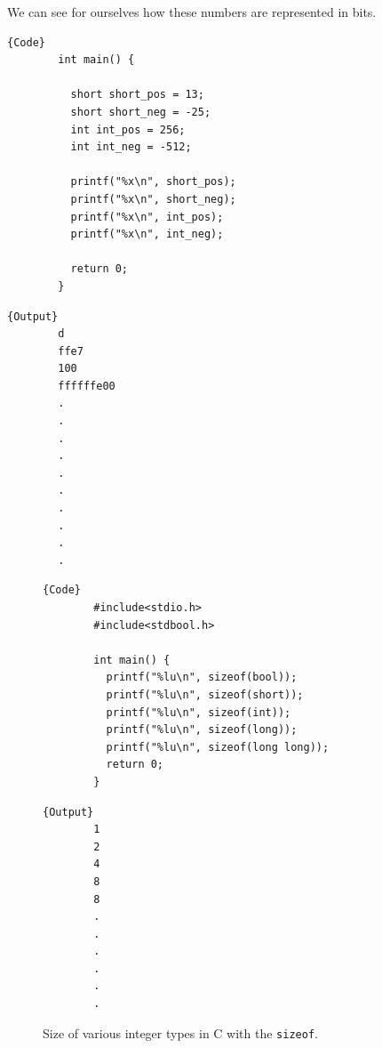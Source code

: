 \documentclass{article}
\begin{document}
    \begin{example}
      We can see for ourselves how these numbers are represented in bits. 

      \noindent\begin{minipage}{.5\textwidth}
      \begin{lstlisting}[]{Code}
        int main() { 

          short short_pos = 13; 
          short short_neg = -25; 
          int int_pos = 256;
          int int_neg = -512; 

          printf("%x\n", short_pos);
          printf("%x\n", short_neg);
          printf("%x\n", int_pos);
          printf("%x\n", int_neg);

          return 0; 
        }
      \end{lstlisting}
      \end{minipage}
      \hfill
      \begin{minipage}{.49\textwidth}
      \begin{lstlisting}[]{Output}
        d
        ffe7
        100
        ffffffe00
        .
        .
        .
        .
        .
        .
        .
        .
        .
        .
      \end{lstlisting}
      \end{minipage}
    \end{example}

    \begin{figure}[H]
      \centering 
      \noindent\begin{minipage}{.5\textwidth}
      \begin{lstlisting}[]{Code}
        #include<stdio.h>
        #include<stdbool.h>

        int main() {
          printf("%lu\n", sizeof(bool)); 
          printf("%lu\n", sizeof(short)); 
          printf("%lu\n", sizeof(int)); 
          printf("%lu\n", sizeof(long)); 
          printf("%lu\n", sizeof(long long)); 
          return 0; 
        }
      \end{lstlisting}
      \end{minipage}
      \hfill
      \begin{minipage}{.49\textwidth}
      \begin{lstlisting}[]{Output}
        1
        2
        4
        8
        8
        .
        .
        .
        .
        .
        .
      \end{lstlisting}
      \end{minipage}
      \caption{Size of various integer types in C with the \texttt{sizeof}.} 
      \label{fig:integer_size}
    \end{figure}
\end{document}
